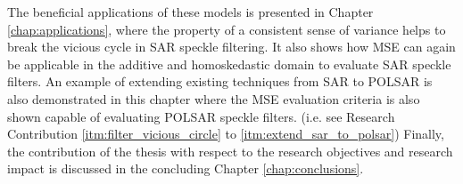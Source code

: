  The
                beneficial applications of these models is presented in
                Chapter \ref{chap:applications}, where the property of a consistent sense of variance
                 helps to break the vicious cycle in SAR
                speckle filtering.
It
                also shows how MSE can again be applicable in the
                additive and homoskedastic domain to evaluate SAR
                speckle filters.
An
                example of extending existing techniques from SAR to
                POLSAR is also demonstrated in this chapter where the
                MSE evaluation criteria is also shown capable of
                evaluating POLSAR speckle filters.
(i.e. see Research Contribution \ref{itm:filter_vicious_circle} to \ref{itm:extend_sar_to_polsar})
Finally, the contribution of the thesis with respect to the research objectives and research impact is discussed in the concluding Chapter \ref{chap:conclusions}.


%

